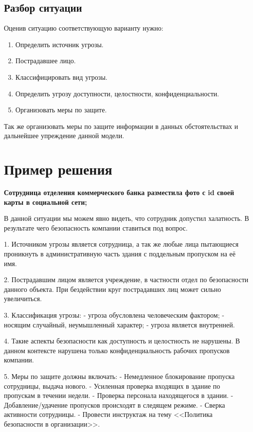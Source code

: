 \subsection{Разбор ситуации}\label{sect1_b_2}
Оценив ситуацию соответствующую варианту нужно:
\begin{enumerate}
  \item Определить источник угрозы.
  \item Пострадавшее лицо.
  \item Классифицировать вид угрозы.
  \item Определить угрозу доступности, целостности, конфиденциальности.
  \item Организовать меры по защите.
\end{enumerate}

Так же организовать меры по защите информации в данных обстоятельствах и дальнейшее упреждение данной модели.


\section{Пример решения}\label{sect1_c}

\textbf{Сотрудница отделения коммерческого банка разместила фото с id своей карты в социальной сети;}

В данной ситуации мы можем явно видеть, что сотрудник допустил халатность. В результате чего безопасность компании ставиться под вопрос. 

1. Источником угрозы является сотрудница, а так же любые лица пытающиеся проникнуть в административную часть здания с поддельным пропуском на её имя.

2. Пострадавшим лицом является учреждение, в частности отдел по безопасности данного объекта. При бездействии круг пострадавших лиц может сильно увеличиться.

3. Классификация угрозы:
- угроза обусловлена человеческим фактором;
- носящим случайный, неумышленный характер;
- угроза является внутренней.

4. Такие аспекты безопасности как доступность и целостность не нарушены. В данном контексте нарушена только конфиденциальность рабочих пропусков компании. 

5. Меры по защите должны включать:
- Немедленное блокирование пропуска сотрудницы, выдача нового.
- Усиленная проверка входящих в здание по пропускам в течении недели.
- Проверка персонала находящегося в здании.
- Добавление/удачение пропусков происходят в следящем режиме.
- Сверка активности сотрудницы.
- Провести инструктаж на тему <<Политика безопасности в организации>>.
 

